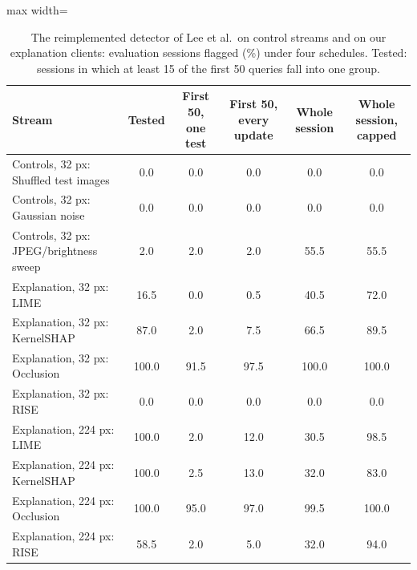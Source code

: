 \begin{table}[!tbp]
\centering\footnotesize\setlength{\tabcolsep}{4pt}
\caption{The reimplemented detector of Lee et al.\ on control streams and on our explanation clients: evaluation sessions flagged (\%) under four schedules. Tested: sessions in which at least 15 of the first 50 queries fall into one group.}
\label{tab:lfcother}
\vspace{3pt}
\begin{adjustbox}{max width=\textwidth}
\begin{tabular}{lccccc}
\toprule
Stream & Tested & First 50, one test & First 50, every update & Whole session & Whole session, capped \\
\midrule
Controls, 32 px: Shuffled test images & 0.0 & 0.0 & 0.0 & 0.0 & 0.0 \\
Controls, 32 px: Gaussian noise & 0.0 & 0.0 & 0.0 & 0.0 & 0.0 \\
Controls, 32 px: JPEG/brightness sweep & 2.0 & 2.0 & 2.0 & 55.5 & 55.5 \\
Explanation, 32 px: LIME & 16.5 & 0.0 & 0.5 & 40.5 & 72.0 \\
Explanation, 32 px: KernelSHAP & 87.0 & 2.0 & 7.5 & 66.5 & 89.5 \\
Explanation, 32 px: Occlusion & 100.0 & 91.5 & 97.5 & 100.0 & 100.0 \\
Explanation, 32 px: RISE & 0.0 & 0.0 & 0.0 & 0.0 & 0.0 \\
Explanation, 224 px: LIME & 100.0 & 2.0 & 12.0 & 30.5 & 98.5 \\
Explanation, 224 px: KernelSHAP & 100.0 & 2.5 & 13.0 & 32.0 & 83.0 \\
Explanation, 224 px: Occlusion & 100.0 & 95.0 & 97.0 & 99.5 & 100.0 \\
Explanation, 224 px: RISE & 58.5 & 2.0 & 5.0 & 32.0 & 94.0 \\
\bottomrule
\end{tabular}
\end{adjustbox}
\end{table}
